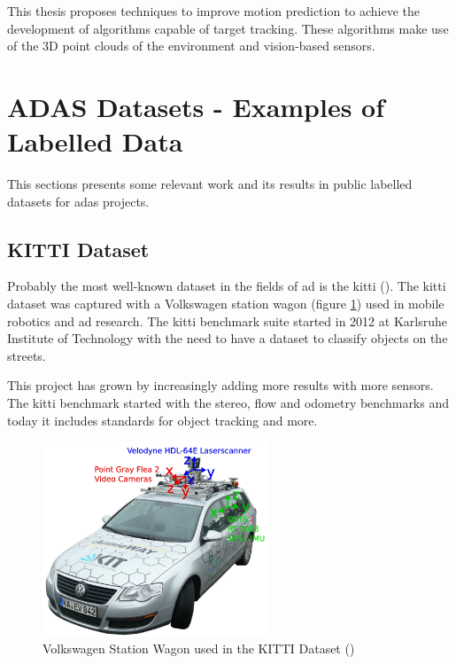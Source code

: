 This thesis proposes techniques to improve motion prediction to achieve the development of algorithms capable of target tracking. These algorithms make use of the 3D point clouds of the environment and vision-based sensors. 

\section{ADAS Datasets - Examples of Labelled Data}

This sections presents some relevant work and its results in public labelled datasets for \gls{adas} projects.

\subsection{KITTI Dataset}
Probably the most well-known dataset in the fields of \gls{ad} is the \gls{kitti} (\cite{KarlsruheInstituteofTechnology}). The \gls{kitti} dataset was captured with a Volkswagen station wagon (figure \ref{fig:kitticar}) used in mobile robotics and \gls{ad} research. The \gls{kitti} benchmark suite started in 2012 at Karlsruhe Institute of Technology with the need to have a dataset to classify objects on the streets. 

This project has grown by increasingly adding more results with more sensors. The \gls{kitti} benchmark started with the stereo, flow and odometry benchmarks and today it includes standards for object tracking and more. 

\begin{figure}
	
	\centering
	\includegraphics[width=0.6\textwidth]{capstate/imgs/kitticar}
	
	\caption{Volkswagen Station Wagon used in the KITTI Dataset (\cite{KarlsruheInstituteofTechnology})}
	\label{fig:kitticar}
	
\end{figure}


